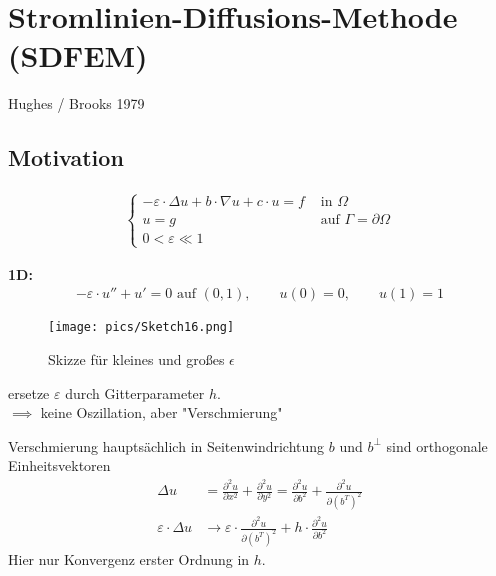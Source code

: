 \section{Stromlinien-Diffusions-Methode (SDFEM)} %
Hughes / Brooks 1979

\subsection{Motivation}
\begin{align*}
\left\lbrace
	\begin{array}{rl}
	-\varepsilon\cdot\Delta u+b\cdot \nabla u+c\cdot u=f&\text{ in }\Omega\\
	u=g&\text{ auf }\Gamma=\partial\Omega\\
	0<\varepsilon\ll 1&
	\end{array}
	\right.
\end{align*}

\textbf{1D:}
\begin{align*}
	-\varepsilon\cdot u''+u'=0\text{ auf }(0,1),\qquad u(0)=0,\qquad u(1)=1
\end{align*}
\begin{figure}[!ht]
	\begin{center}
		\texttt{[image: pics/Sketch16.png]}
		\caption{Skizze für kleines und großes $\epsilon$}
		\label{AbbEinfachesStromlinienProblem}
	\end{center}
\end{figure}

ersetze $\varepsilon$ durch Gitterparameter $h$.\\
$\implies$ keine Oszillation, aber "Verschmierung" %

Verschmierung hauptsächlich in Seitenwindrichtung
$b$ und $b^\perp$ sind orthogonale Einheitsvektoren
\begin{align*}
	\Delta u&=\frac{\partial^2 u}{\partial x^2}+\frac{\partial^2 u}{\partial y^2}
	=\frac{\partial^2 u}{\partial b^2}+\frac{\partial^2 u}{\partial (b^T)^2}\\
	\varepsilon\cdot\Delta u&\to\varepsilon\cdot\frac{\partial^2 u}{\partial(b^T)^2}+h\cdot\frac{\partial^2 u}{\partial b^2}
\end{align*}
Hier nur Konvergenz erster Ordnung in $h$.

